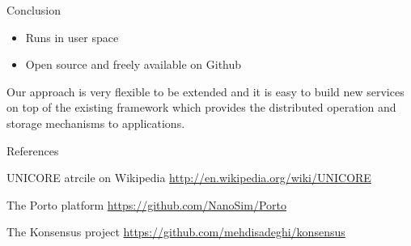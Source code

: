 \documentclass[final,hyperref={pdfpagelabels=true}]{beamer}
\newenvironment{postit}
{\begin{beamercolorbox}[sep=1em,wd=7cm]{postit}}
{\end{beamercolorbox}}
\begin{document}
\begin{frame}
\begin{columns}[t]
\begin{column}{.45\textwidth}
\begin{block}{Conclusion}
\begin{itemize}
\begin{itemize}
	  \item Runs in user space
	  \item Open source and freely available on Github\cite{konsensus}
	  \end{itemize}
	  \end{itemize}
	  Our approach is very flexible to be extended and it is easy to build new services on top of the existing framework 
	  which provides the distributed operation and storage mechanisms to applications.
	  \end{block}
      \begin{block}{References}
      \fontsize{17pt}{18}\selectfont
        \begin{thebibliography}{999}
        UNICORE atrcile on Wikipedia
        \url{http://en.wikipedia.org/wiki/UNICORE}
        
        The Porto platform
        \url{https://github.com/NanoSim/Porto}
        
        The Konsensus project \url{https://github.com/mehdisadeghi/konsensus}
%          
          
        \end{thebibliography}
      \end{block}
    \end{column}
  \end{columns}

  
\end{frame}
\end{document}
